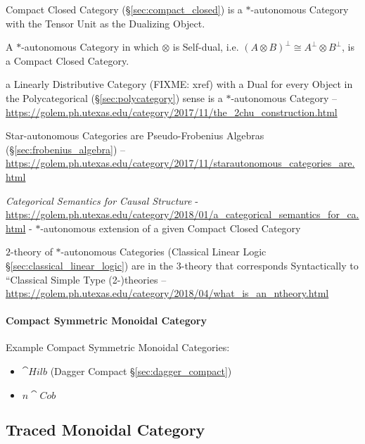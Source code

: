 Compact Closed Category (\S\ref{sec:compact_closed}) is a
$*$-autonomous Category with the Tensor Unit as the Dualizing Object.

A $*$-autonomous Category in which $\otimes$ is Self-dual, i.e. $(A
\otimes B)^\bot \cong A^\bot \otimes B^\bot$, is a Compact Closed
Category. \cite{abramsky-gay-nagarajan96}

a Linearly Distributive Category (FIXME: xref) with a Dual for every Object in
the Polycategorical (\S\ref{sec:polycategory}) sense is a $*$-autonomous
Category
--\url{https://golem.ph.utexas.edu/category/2017/11/the_2chu_construction.html}

Star-autonomous Categories are Pseudo-Frobenius Algebras
(\S\ref{sec:frobenius_algebra})
--\url{https://golem.ph.utexas.edu/category/2017/11/starautonomous_categories_are.html}

\emph{Categorical Semantics for Causal Structure} -
\url{https://golem.ph.utexas.edu/category/2018/01/a_categorical_semantics_for_ca.html}
- $*$-autonomous extension of a given Compact Closed Category

$2$-theory of $*$-autonomous Categories (Classical Linear Logic
\S\ref{sec:classical_linear_logic}) are in the $3$-theory that corresponds
Syntactically to ``Classical Simple Type (2-)theories --
\url{https://golem.ph.utexas.edu/category/2018/04/what_is_an_ntheory.html}



\paragraph{Compact Symmetric Monoidal Category}
\label{sec:compact_symmetric_monoidal}\hfill

Example Compact Symmetric Monoidal Categories:

\begin{itemize}
\item $\cat{Hilb}$ (Dagger Compact \S\ref{sec:dagger_compact})
\item $n\cat{Cob}$
\end{itemize}



\subsection{Traced Monoidal Category}\label{sec:traced_monoidal}

